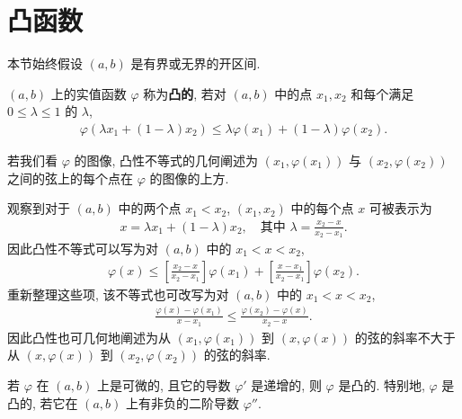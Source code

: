 \documentclass[../../main.tex]{subfiles}
\begin{document}
\section{凸函数}\label{section:ch06-凸函数}

本节始终假设 $(a,b)$ 是有界或无界的开区间.

\begin{definition}[凸函数]\label{definition:ch06-凸函数}
$(a,b)$ 上的实值函数 $\varphi$ 称为\textbf{凸的}, 若对 $(a,b)$ 中的点 $x_{1},x_{2}$ 和每个满足 $0\leqslant\lambda\leqslant 1$ 的 $\lambda$,
\begin{align}
\varphi(\lambda x_{1}+(1-\lambda)x_{2})\leqslant\lambda\varphi(x_{1})+(1-\lambda)\varphi(x_{2}).\label{align:ch06-凸不等式}
\end{align}
\end{definition}

若我们看 $\varphi$ 的图像, 凸性不等式的几何阐述为 $(x_{1},\varphi(x_{1}))$ 与 $(x_{2},\varphi(x_{2}))$ 之间的弦上的每个点在 $\varphi$ 的图像的上方.

观察到对于 $(a,b)$ 中的两个点 $x_{1}<x_{2}$, $(x_{1},x_{2})$ 中的每个点 $x$ 可被表示为
\begin{align*}
x=\lambda x_{1}+(1-\lambda)x_{2},\quad\text{其中 }\lambda=\frac{x_{2}-x}{x_{2}-x_{1}}.
\end{align*}
因此凸性不等式可以写为对 $(a,b)$ 中的 $x_{1}<x<x_{2}$,
\begin{align*}
\varphi(x)\leqslant\left[\frac{x_{2}-x}{x_{2}-x_{1}}\right]\varphi(x_{1})+\left[\frac{x-x_{1}}{x_{2}-x_{1}}\right]\varphi(x_{2}).
\end{align*}
重新整理这些项, 该不等式也可改写为对 $(a,b)$ 中的 $x_{1}<x<x_{2}$,
\begin{align}
\frac{\varphi(x)-\varphi(x_{1})}{x-x_{1}}\leqslant\frac{\varphi(x_{2})-\varphi(x)}{x_{2}-x}.\label{align:ch06-弦斜率}
\end{align}
因此凸性也可几何地阐述为从 $(x_{1},\varphi(x_{1}))$ 到 $(x,\varphi(x))$ 的弦的斜率不大于从 $(x,\varphi(x))$ 到 $(x_{2},\varphi(x_{2}))$ 的弦的斜率.

\begin{proposition}\label{proposition:ch06-导数递增凸}
若 $\varphi$ 在 $(a,b)$ 上是可微的, 且它的导数 $\varphi'$ 是递增的, 则 $\varphi$ 是凸的. 特别地, $\varphi$ 是凸的, 若它在 $(a,b)$ 上有非负的二阶导数 $\varphi''$.
\end{proposition}
\end{document}
